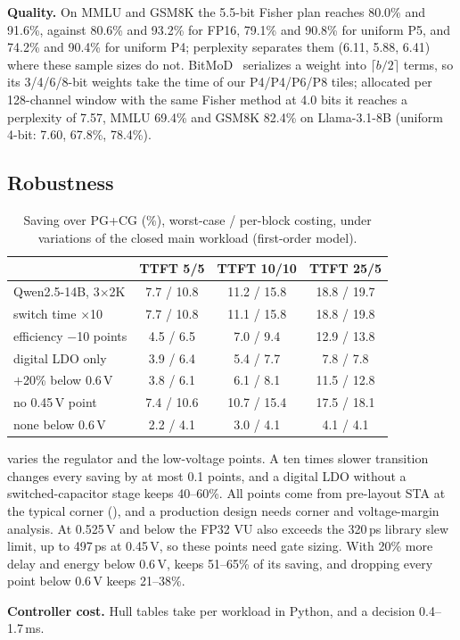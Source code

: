 \textbf{Quality.}
On MMLU and GSM8K the 5.5-bit Fisher plan reaches 80.0\% and 91.6\%, against 80.6\% and 93.2\% for FP16, 79.1\% and 90.8\% for uniform P5, and 74.2\% and 90.4\% for uniform P4; perplexity separates them (6.11, 5.88, 6.41) where these sample sizes do not.
BitMoD~\cite{chen2025bitmod} serializes a weight into $\lceil b/2\rceil$ terms, so its 3/4/6/8-bit weights take the time of our P4/P4/P6/P8 tiles; allocated per 128-channel window with the same Fisher method at 4.0 bits it reaches a perplexity of 7.57, MMLU 69.4\% and GSM8K 82.4\% on Llama-3.1-8B (uniform 4-bit: 7.60, 67.8\%, 78.4\%).

\subsection{Robustness}

\begin{table}[t]
\centering
\caption{Saving over PG+CG (\%), worst-case / per-block costing, under variations of the closed main workload (first-order model).}
\label{tab:robust}
\small
\setlength{\tabcolsep}{4pt}
\begin{tabular}{@{}lccc@{}}
\toprule
 & TTFT 5/5 & TTFT 10/10 & TTFT 25/5 \\
\midrule
Qwen2.5-14B, 3$\times$2K & 7.7 / 10.8 & 11.2 / 15.8 & 18.8 / 19.7 \\
\quad switch time $\times$10 & 7.7 / 10.8 & 11.1 / 15.8 & 18.8 / 19.8 \\
\quad efficiency $-$10 points & 4.5 / 6.5 & 7.0 / 9.4 & 12.9 / 13.8 \\
\quad digital LDO only & 3.9 / 6.4 & 5.4 / 7.7 & 7.8 / 7.8 \\
\quad $+$20\% below 0.6\,V & 3.8 / 6.1 & 6.1 / 8.1 & 11.5 / 12.8 \\
\quad no 0.45\,V point & 7.4 / 10.6 & 10.7 / 15.4 & 17.5 / 18.1 \\
\quad none below 0.6\,V & 2.2 / 4.1 & 3.0 / 4.1 & 4.1 / 4.1 \\
\bottomrule
\end{tabular}
\end{table}

 varies the regulator and the low-voltage points. A ten times slower transition changes every saving by at most 0.1 points, and a digital LDO without a switched-capacitor stage keeps 40--60\%.
All points come from pre-layout STA at the typical corner (), and a production design needs corner and voltage-margin analysis. At 0.525\,V and below the FP32 VU also exceeds the 320\,ps library slew limit, up to 497\,ps at 0.45\,V, so these points need gate sizing.
With 20\% more delay and energy below 0.6\,V, \sys{} keeps 51--65\% of its saving, and dropping every point below 0.6\,V keeps 21--38\%.

\textbf{Controller cost.}
Hull tables take  per workload in Python, and a decision 0.4--1.7\,ms.
